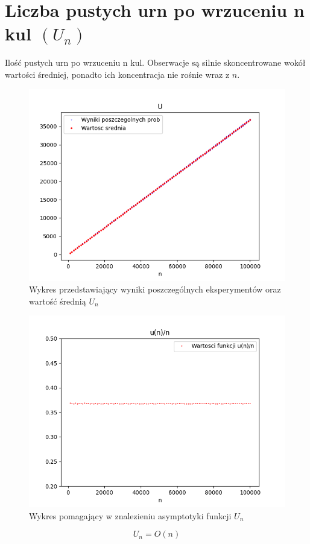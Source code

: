 \documentclass{report}
\begin{document}
\section*{Liczba pustych urn po wrzuceniu n kul \((U_n)\)}
\justifying
Ilość pustych urn po wrzuceniu n kul.
Obserwacje są silnie skoncentrowane wokół wartości średniej, ponadto
ich koncentracja nie rośnie wraz z \(n\).
    \begin{figure}[htp]
        \centering
        \includegraphics[scale=0.7]{plotU.png}
        \caption[Example .]{Wykres przedstawiający wyniki poszczególnych eksperymentów oraz wartość średnią \(U_{n}\)}
        \label{plotU}
    \end{figure}

    \begin{figure}[H]
        \centering
        \includegraphics[scale=0.7]{plotunfunc.png}
        \caption[Example .]{Wykres pomagający w znalezieniu asymptotyki funkcji \(U_n\)}
        \label{plotUn}
    \end{figure}
\[U_n=O(n)\]
\end{document}
